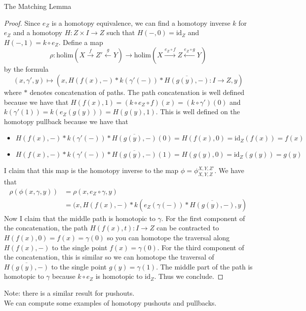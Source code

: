 \documentclass[a4paper]{article}
\begin{document}
\begin{thm}{The Matching Lemma}{}
\begin{proof}
Since $e_Z$ is a homotopy equivalence, we can find a homotopy inverse $k$ for $e_Z$ and a homotopy $H:Z\times I\to Z$ such that $H(-,0)=\text{id}_Z$ and $H(-,1)=k\circ e_Z$. Define a map $$\rho:\text{holim}(X\overset{f}{\rightarrow}Z'\overset{g}{\leftarrow}Y)\to\text{holim}(X\overset{e_Z\circ f}{\rightarrow}Z\overset{e_Z\circ g}{\leftarrow}Y)$$ by the formula $$(x,\gamma',y)\mapsto(x,H(f(x),-)\ast k(\gamma'(-))\ast\overline{H(g(y),-)}:I\to Z,y)$$ where $\ast$ denotes concatenation of paths. The path concatenation is well defined because we have that $H(f(x),1)=(k\circ e_Z\circ f)(x)=(k\circ\gamma')(0)$ and $k(\gamma'(1))=k(e_Z(g(y)))=H(g(y),1)$. This is well defined on the homotopy pullback because we have that 
\begin{itemize}
\item $H(f(x),-)\ast k(\gamma'(-))\ast\overline{H(g(y),-)}(0)=H(f(x),0)=\text{id}_Z(f(x))=f(x)$
\item $H(f(x),-)\ast k(\gamma'(-))\ast\overline{H(g(y),-)}(1)=H(g(y),0)=\text{id}_Z(g(y))=g(y)$
\end{itemize}
I claim that this map is the homotopy inverse to the map $\phi=\phi_{X,Y,Z}^{X,Y,Z'}$. We have that 
\begin{align*}
\rho(\phi(x,\gamma,y))&=\rho(x,e_Z\circ\gamma,y)\\
&=(x,H(f(x),-)\ast k(e_Z(\gamma(-))\ast\overline{H(g(y),-)},y)
\end{align*}
Now I claim that the middle path is homotopic to $\gamma$. For the first component of the concatenation, the path $H(f(x),t):I\to Z$ can be contracted to $H(f(x),0)=f(x)=\gamma(0)$ so you can homotope the traversal along $H(f(x),-)$ to the single point $f(x)=\gamma(0)$. For the third component of the concatenation, this is similar so we can homotope the traversal of $\overline{H(g(y),-)}$ to the single point $g(y)=\gamma(1)$. The middle part of the path is homotopic to $\gamma$ because $k\circ e_Z$ is homotopic to $\text{id}_Z$. Thus we conclude. 
\end{proof}
\end{thm}

Note: there is a similar result for pushouts. \\

We can compute some examples of homotopy pushouts and pullbacks. 
\end{document}
